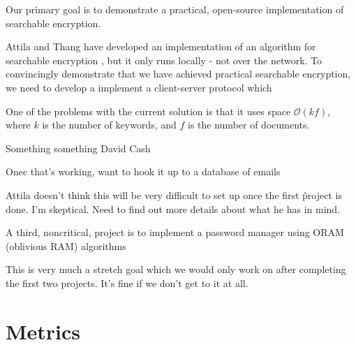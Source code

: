\documentclass[onecolumn, draftclsnofoot,10pt, compsoc]{IEEEtran}
\begin{document}

Our primary goal is to demonstrate a practical, open-source implementation of searchable encryption.





Attila and Thang have developed an implementation of an algorithm for searchable encryption \cite{yavuz17}, but it only runs locally - not over the network. To convincingly demonstrate that we have achieved practical searchable encryption, we need to develop a implement a client-server protocol which


One of the problems with the current solution is that it uses space $\mathcal{O}(kf)$, where $k$ is the number of keywords, and $f$ is the number of documents.



Something something David Cash \cite{cryptoeprint:2014:853}



Onec that's working, want to hook it up to a database of emails

    Attila doesn't think this will be very difficult to set up once the first \^ project is done. I'm skeptical. Need to find out more details about what he has in mind.



A third, noncritical, project is to implement a password manager using ORAM (oblivious RAM) algorithms

    This is very much a stretch goal which we would only work on after completing the first two projects. It's fine if we don't get to it at all.


\section{Metrics}
\end{document}

